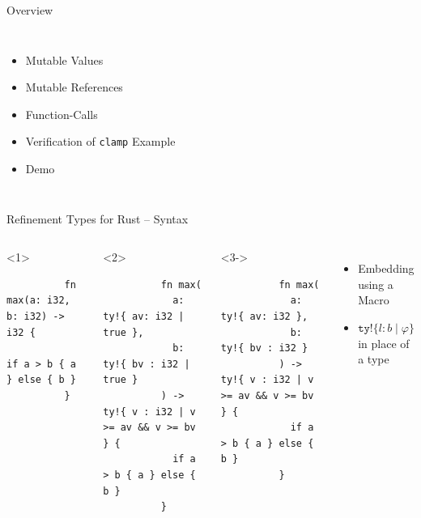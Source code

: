 \documentclass{sdqbeamer}
\newcommand{\code}[1]{\texttt{#1}}
\begin{document}
\begin{frame}{Overview}
  \begin{columns}
    \begin{itemize}
      \item Mutable Values
      \item Mutable References
      \item Function-Calls 
      \item Verification of \code{clamp} Example
      \item Demo
    \end{itemize}

    \inputminted[fontsize=\footnotesize]{rust}{./snippets/clamp-with-spec.rs}
  \end{columns}
\end{frame}

\begin{frame}[fragile]{Refinement Types for Rust -- Syntax}
  \begin{columns}
      \begin{onlyenv}<1>
        \begin{verbatim}
          fn max(a: i32, b: i32) -> i32 {
            if a > b { a } else { b }
          }
        \end{verbatim}
      \end{onlyenv}
      \begin{onlyenv}<2>
        \begin{verbatim}
          fn max(
            a: ty!{ av: i32 | true }, 
            b: ty!{ bv : i32 | true }
          ) -> ty!{ v : i32 | v >= av && v >= bv } {
            if a > b { a } else { b }
          }
        \end{verbatim}
      \end{onlyenv}
      \begin{onlyenv}<3->
        \begin{verbatim}
          fn max(
            a: ty!{ av: i32 }, 
            b: ty!{ bv : i32 }
          ) -> ty!{ v : i32 | v >= av && v >= bv } {
            if a > b { a } else { b }
          }
        \end{verbatim}
      \end{onlyenv}

    \begin{itemize}
      \item Embedding using a Macro
      \item $\code{ty!}\{ l : b \mid \varphi \}$ in place of a type
    \end{itemize}
  \end{columns}
\end{frame}
\end{document}
